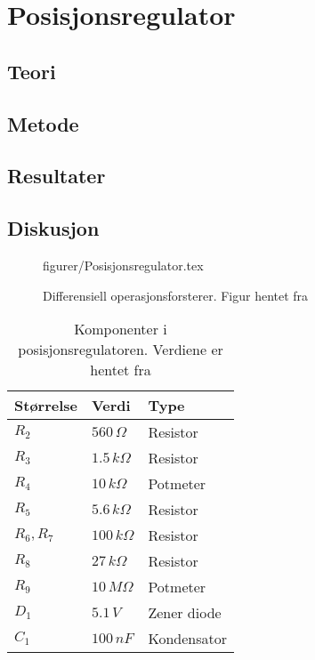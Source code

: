\section{Posisjonsregulator}\label{sec:posisjonsregulator}

\subsection{Teori}

\subsection{Metode}

\subsection{Resultater}

\subsection{Diskusjon}

\begin{figure} [h]
     {figurer/Posisjonsregulator.tex}
    \caption{Differensiell operasjonsforsterer. Figur hentet fra \cite{AnalogMotorlabbOppgaver}}
    \label{fig:Posisjonsregulator}
\end{figure}

\begin{table}[b]
    \centering
    \caption{Komponenter i posisjonsregulatoren. Verdiene er hentet fra \cite{AnalogMotorlabbOppgaver}}
    \begin{tabular}{lll}
        \toprule
		Størrelse & Verdi & Type \\
		\midrule
        $R_2$ & $560\,\Omega$ & Resistor \\
        $R_3$ & $1.5\,k\Omega$ & Resistor\\
        $R_4$ & $10\,k\Omega$ & Potmeter\\
        $R_5$ & $5.6\,k\Omega$ & Resistor\\
        $R_6, R_7$ & $100\,k\Omega$ & Resistor\\
        $R_8$ & $27\,k\Omega$ & Resistor\\
        $R_9$ & $10\,M\Omega$ & Potmeter\\
        $D_1$ & $5.1\,V$ & Zener diode\\
        $C_1$ & $100\,nF$ & Kondensator\\
		\bottomrule
    \end{tabular}
    \label{tab:my_label}
\end{table}



